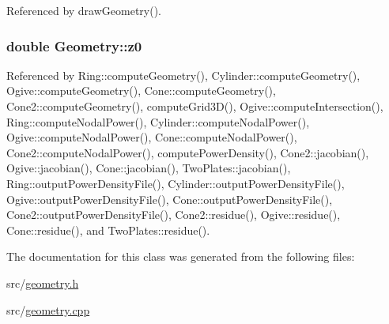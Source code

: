 Referenced by draw\-Geometry().

\hypertarget{classGeometry_a755ef6125e306d96ba8b4a01f3593b66}{
\subsubsection[{z0}]{\setlength{\rightskip}{0pt plus 5cm}double Geometry\-::z0\hspace{0.3cm}{\ttfamily [protected]}}}\label{classGeometry_a755ef6125e306d96ba8b4a01f3593b66}


Referenced by Ring\-::compute\-Geometry(), Cylinder\-::compute\-Geometry(), Ogive\-::compute\-Geometry(), Cone\-::compute\-Geometry(), Cone2\-::compute\-Geometry(), compute\-Grid3\-D(), Ogive\-::compute\-Intersection(), Ring\-::compute\-Nodal\-Power(), Cylinder\-::compute\-Nodal\-Power(), Ogive\-::compute\-Nodal\-Power(), Cone\-::compute\-Nodal\-Power(), Cone2\-::compute\-Nodal\-Power(), compute\-Power\-Density(), Cone2\-::jacobian(), Ogive\-::jacobian(), Cone\-::jacobian(), Two\-Plates\-::jacobian(), Ring\-::output\-Power\-Density\-File(), Cylinder\-::output\-Power\-Density\-File(), Ogive\-::output\-Power\-Density\-File(), Cone\-::output\-Power\-Density\-File(), Cone2\-::output\-Power\-Density\-File(), Cone2\-::residue(), Ogive\-::residue(), Cone\-::residue(), and Two\-Plates\-::residue().



The documentation for this class was generated from the following files\-:\begin{DoxyCompactItemize}
\item 
src/\hyperlink{geometry_8h}{geometry.\-h}\item 
src/\hyperlink{geometry_8cpp}{geometry.\-cpp}\end{DoxyCompactItemize}
